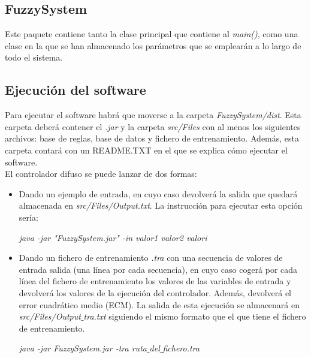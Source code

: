\documentclass[12pt,a4paper]{article}
\begin{document}
\subsection{FuzzySystem}
Este paquete contiene tanto la clase principal que contiene al \textit{main()}, como una clase en la que se han almacenado los parámetros que se emplearán a lo largo de todo el sistema.


\subsection{Ejecución del software}
Para ejecutar el software habrá que moverse a la carpeta \textit{FuzzySystem/dist}. Esta carpeta deberá contener el \textit{.jar} y la carpeta \textit{src/Files} con al menos los siguientes archivos: base de reglas, base de datos y fichero de entrenamiento. Además, esta carpeta contará con un README.TXT en el que se explica cómo ejecutar el software.\\
El controlador difuso se puede lanzar de dos formas:
\begin{itemize}
\item Dando un ejemplo de entrada, en cuyo caso devolverá la salida que quedará almacenada en \textit{src/Files/Output.txt}. La instrucción para ejecutar esta opción sería:
\begin{center}
\textit{java -jar "FuzzySystem.jar" -in valor1 valor2 valori}
\end{center}
\item Dando un fichero de entrenamiento \textit{.tra} con una secuencia de valores de entrada salida (una línea por cada secuencia), en cuyo caso cogerá por cada línea del fichero de entrenamiento los valores de las variables de entrada y devolverá los valores de la ejecución del controlador. Además, devolverá el error cuadrático medio (ECM). La salida de esta ejecución se almacenará en \textit{src/Files/Output$\_$tra.txt} siguiendo el mismo formato que el que tiene el fichero de entrenamiento. 
\begin{center}
\textit{java -jar FuzzySystem.jar -tra ruta$\_$del$\_$fichero.tra}
\end{center}
\end{itemize}
\end{document}
